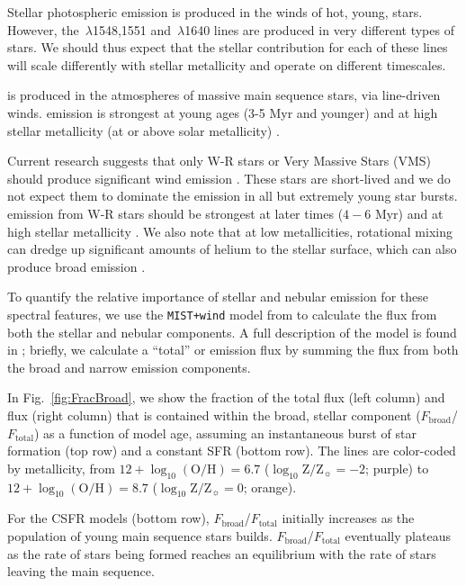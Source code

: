 \documentclass[trackchanges, preprint2]{aastex62}
\newcommand{\heii}{\ion{He}{2}}
\newcommand{\civ}{\ion{C}{4}}
\newcommand{\Myr}{$\,$Myr\xspace}
\newcommand{\logten}{\ensuremath{\log_{10}}}
\newcommand{\logOH}{\ensuremath{\logten (\mathrm{O}/\mathrm{H})}\xspace}
\newcommand{\logZeq}[1]{\ensuremath{\logten \mathrm{Z}/\mathrm{Z}_{\sun} = #1}}
\begin{document}
Stellar photospheric emission is produced in the winds of hot, young, stars. However, the \civ$\,\lambda$1548,1551 and \heii$\,\lambda$1640 lines are produced in very different types of stars. We should thus expect that the stellar contribution for each of these lines will scale differently with stellar metallicity and operate on different timescales.

\civ{} is produced in the atmospheres of massive main sequence stars, via line-driven winds. \civ{} emission is strongest at young ages (3-5\,\Myr and younger) and at high stellar metallicity (at or above solar metallicity) \citep{Walborn+1987, Pauldrach+1990, Leitherer+1995, Walborn+2002}.

Current research suggests that only W-R stars or Very Massive Stars (VMS) should produce significant \heii{} wind emission \citep[e.g.,][]{Crowther+2016, Leitherer+2018}. These stars are short-lived and we do not expect them to dominate the \heii{} emission in all but extremely young star bursts. \heii{} emission from W-R stars should be strongest at later times ($4-6\,$\Myr) and at high stellar metallicity \citep[e.g.,][]{Schaerer+1998, Vink+2005}. We also note that at low metallicities, rotational mixing can dredge up significant amounts of helium to the stellar surface, which can also produce broad \heii{} emission \citep[e.g., ][]{Yoon+2005, Cantiello+2007, Eldridge+2011, Choi+2017, Eldridge+2017}.

To quantify the relative importance of stellar and nebular emission for these spectral features, we use the {\tt MIST+wind} model from  to calculate the flux from both the stellar and nebular components. A full description of the model is found in ; briefly, we calculate a ``total'' \civ{} or \heii{} emission flux by summing the flux from both the broad and narrow emission components.

In Fig.~\ref{fig:FracBroad}, we show the fraction of the total \civ{} flux (left column) and \heii{} flux (right column) that is contained within the broad, stellar component ($F_{\mathrm{broad}}$/$F_{\mathrm{total}}$) as a function of model age, assuming an instantaneous burst of star formation (top row) and a constant SFR (bottom row). The lines are color-coded by metallicity, from $12+\logOH=6.7$ (\logZeq{-2}; purple) to $12+\logOH=8.7$ (\logZeq{0}; orange). 

For the CSFR models (bottom row), $F_{\mathrm{broad}}$/$F_{\mathrm{total}}$ initially increases as the population of young main sequence stars builds. $F_{\mathrm{broad}}$/$F_{\mathrm{total}}$ eventually plateaus as the rate of stars being formed reaches an equilibrium with the rate of stars leaving the main sequence.
\end{document}
